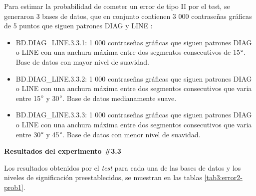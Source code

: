\documentclass[12pt]{report}
\begin{document}
Para estimar la probabilidad de cometer un error de tipo II por el test, se generaron 3 bases de datos, que en conjunto contienen 3 000 contraseñas gráficas de 5 puntos que siguen patrones DIAG y LINE :
\begin{itemize}
	\item BD.DIAG\_LINE.3.3.1: 1 000 contraseñas gráficas que siguen patrones DIAG o LINE con una anchura máxima entre dos segmentos consecutivos de 15$\degree$. Base de datos con mayor nivel de suavidad. 
	\item BD.DIAG\_LINE.3.3.2: 1 000 contraseñas gráficas que siguen patrones DIAG o LINE con una anchura máxima entre dos segmentos consecutivos que varia entre 15$\degree$ y 30$\degree$. Base de datos medianamente suave.
	\item BD.DIAG\_LINE.3.3.3: 1 000 contraseñas gráficas que siguen patrones DIAG o LINE con una anchura máxima entre dos segmentos consecutivos que varia entre 30$\degree$ y 45$\degree$. Base de datos con menor nivel de suavidad.
\end{itemize}
\textbf{Resultados del experimento \#3.3}

Los resultados obtenidos por el \textit{test}  para cada una de las bases de datos y los  niveles de significación preestablecidos, se muestran en las tablas \ref{tab3:error2-prob1}.
\end{document}

